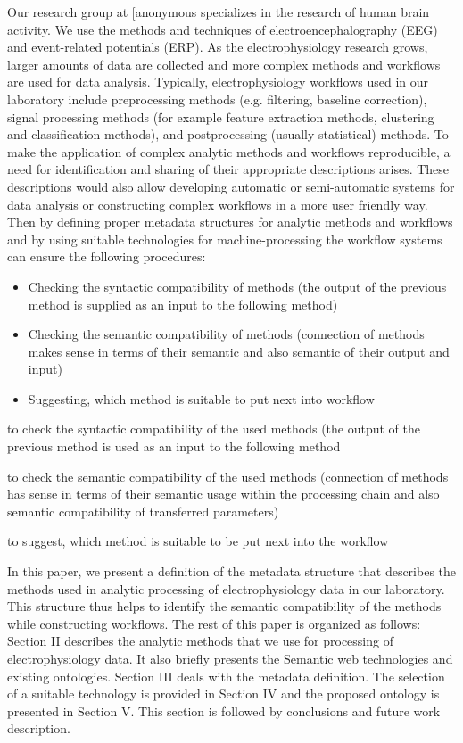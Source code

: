 \documentclass[a4paper,twoside]{article}
\begin{document}
\noindent Our research group at [anonymous%
specializes in the research of human brain activity. We use the methods and techniques of electroencephalography (EEG) and event-related potentials (ERP). As the electrophysiology research grows, larger amounts of data are collected and more complex methods and workflows are used for data analysis. Typically, electrophysiology workflows used in our laboratory include preprocessing methods (e.g. filtering, baseline correction), signal processing methods (for example feature extraction methods, clustering and classification methods), and postprocessing (usually statistical) methods. To make the application of complex analytic methods and workflows reproducible, a need for identification and sharing of their appropriate descriptions arises. These descriptions would also allow developing automatic or semi-automatic systems for data analysis or constructing complex workflows in a more user friendly way. Then by defining proper metadata structures for analytic methods and workflows and by using suitable technologies for machine-processing the workflow systems can ensure the following procedures:

\begin{itemize}
	\item Checking the syntactic compatibility of methods (the output of the previous method is supplied as an input to the following method)
	
	\item Checking the semantic compatibility of methods (connection of methods makes sense in terms of their semantic and also semantic of their output and input)
	
	\item Suggesting, which method is suitable to put next into workflow
	
\end{itemize}

\item to check the syntactic compatibility of the used methods (the output of the previous method is used as an input to the following method
\item to check the semantic compatibility of the used methods (connection of methods has sense in terms of their semantic usage within the processing chain and also semantic compatibility of transferred parameters) 
\item to suggest, which method is suitable to be put next into the workflow

In this paper, we present a definition of the metadata structure that describes the methods used in analytic processing of electrophysiology data in our laboratory. This structure thus helps to identify the semantic compatibility of the methods while constructing workflows. The rest of this paper is organized as follows: Section II describes the analytic methods that we use for processing of electrophysiology data. It also briefly presents the Semantic web technologies and existing ontologies. Section III deals with the metadata definition. The selection of a suitable technology is provided in Section IV and the proposed ontology is presented in Section V. This section is followed by conclusions and future work description.
\end{document}

